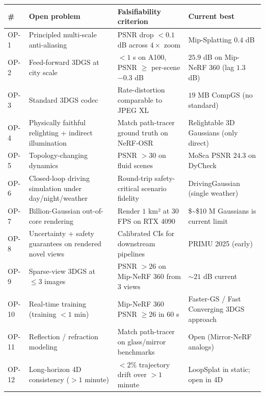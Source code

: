 {\def\LTcaptype{none} %
\begin{longtable}[]{@{}
  >{\raggedright\arraybackslash}p{}
  >{\raggedright\arraybackslash}p{}
  >{\raggedright\arraybackslash}p{}
  >{\raggedright\arraybackslash}p{}@{}}
\toprule\noalign{}
\begin{minipage}[b]{\linewidth}\raggedright
\textbf{\#}
\end{minipage} & \begin{minipage}[b]{\linewidth}\raggedright
\textbf{Open problem}
\end{minipage} & \begin{minipage}[b]{\linewidth}\raggedright
\textbf{Falsifiability criterion}
\end{minipage} & \begin{minipage}[b]{\linewidth}\raggedright
\textbf{Current best}
\end{minipage} \\
\midrule\noalign{}
\endhead
\bottomrule\noalign{}
\endlastfoot
OP-1 & Principled multi-scale anti-aliasing & PSNR drop \(<0.1\) dB across \(4\times\) zoom & Mip-Splatting \(0.4\) dB \\
OP-2 & Feed-forward 3DGS at city scale & \(<1\) s on A100, PSNR \(\geq\) per-scene \(-0.3\) dB & \(25.9\) dB on Mip-NeRF 360 (lag \(1.3\) dB) \\
OP-3 & Standard 3DGS codec & Rate-distortion comparable to JPEG XL & \(19\) MB CompGS (no standard) \\
OP-4 & Physically faithful relighting + indirect illumination & Match path-tracer ground truth on NeRF-OSR & Relightable 3D Gaussians (only direct) \\
OP-5 & Topology-changing dynamics & PSNR \(>30\) on fluid scenes & MoSca PSNR \(24.3\) on DyCheck \\
OP-6 & Closed-loop driving simulation under day/night/weather & Round-trip safety-critical scenario fidelity & DrivingGaussian (single weather) \\
OP-7 & Billion-Gaussian out-of-core rendering & Render \(1\) km² at \(30\) FPS on RTX 4090 & \$\sim\$10 M Gaussians is current limit \\
OP-8 & Uncertainty + safety guarantees on rendered novel views & Calibrated CIs for downstream pipelines & PRIMU 2025 (early) \\
OP-9 & Sparse-view 3DGS at \(\leq 3\) images & PSNR \(>26\) on Mip-NeRF 360 from \(3\) views & \(\sim 21\) dB current \\
OP-10 & Real-time training (training \(<1\) min) & Mip-NeRF 360 PSNR \(\geq 26\) in \(60\) s & Faster-GS / Fast Converging 3DGS approach \\
OP-11 & Reflection / refraction modeling & Match path-tracer on glass/mirror benchmarks & Open (Mirror-NeRF analogs) \\
OP-12 & Long-horizon 4D consistency (\(>1\) minute) & \(<2\%\) trajectory drift over \(>1\) minute & LoopSplat in static; open in 4D \\
\end{longtable}
}

